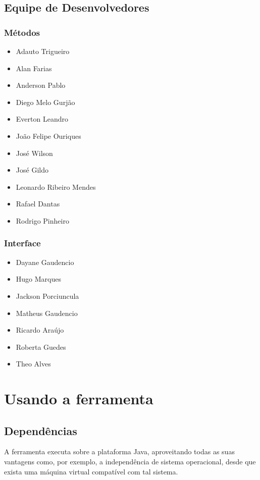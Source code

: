 \documentclass[a4paper,10pt]{report}
\begin{document}
\section{Equipe de Desenvolvedores}

\subsection{Métodos}
\begin{itemize}
 \item Adauto Trigueiro
 \item Alan Farias
 \item Anderson Pablo
 \item Diego Melo Gurjão
 \item Everton Leandro
 \item João Felipe Ouriques
 \item José Wilson
 \item José Gildo
 \item Leonardo Ribeiro Mendes
 \item Rafael Dantas
 \item Rodrigo Pinheiro
\end{itemize}

\subsection{Interface}
\begin{itemize}
 \item Dayane Gaudencio
 \item Hugo Marques
 \item Jackson Porciuncula
 \item Matheus Gaudencio
 \item Ricardo Araújo
 \item Roberta Guedes
 \item Theo Alves
\end{itemize}

\chapter{Usando a ferramenta}
\label{instalacao}

\section{Dependências}

A ferramenta executa sobre a plataforma Java, aproveitando todas as suas
vantagens como, por exemplo, a independência de sistema operacional, desde que
exista uma máquina virtual compatível com tal sistema.
\end{document}
